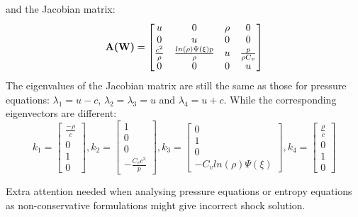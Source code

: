 and the Jacobian matrix: 
\begin{equation}
   \textbf{A(\textbf{W})}=\begin{bmatrix}
         u & 0 & \rho & 0 \\
         0 & u & 0 & 0 \\
         \frac{c^2}{\rho} & \frac{ ln(\rho) \Psi(\xi) p}{\rho} & u &\frac{p}{\rho C_v} \\
         0 & 0 & 0 & u
     \end{bmatrix}
\end{equation}
The eigenvalues of the Jacobian matrix are still the same as those for pressure equations: $\lambda_1 = u-c$,  $\lambda_2 = \lambda_3 = u$ and $\lambda_4 = u+c$. While the corresponding eigenvectors are different: 
\begin{equation}
   k_1 =\begin{bmatrix}
         \frac{-\rho}{c} \\
         0 \\
         1 \\
         0
     \end{bmatrix},
   k_2 =\begin{bmatrix}
         1 \\
         0 \\
         0   \\
         -\frac{C_v c^2}{p}
     \end{bmatrix},
   k_3 =\begin{bmatrix}
         0 \\
         1 \\
         0   \\
         -C_v ln (\rho) \Psi(\xi)
     \end{bmatrix},
   k_4 =\begin{bmatrix}
         \frac{\rho}{c} \\
         0 \\
         1 \\
         0
     \end{bmatrix}
     \label{eq:eigenvector-entropy}
\end{equation}

Extra attention needed when analysing pressure equations or entropy equations as non-conservative formulations might give incorrect shock solution.
 
